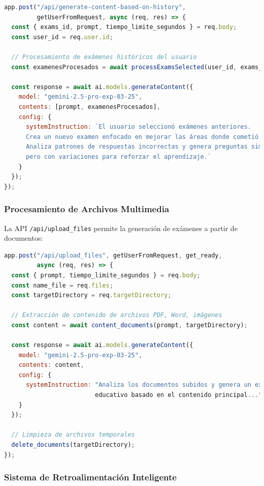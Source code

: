 \documentclass[12pt,a4paper]{report}
\begin{document}
\begin{lstlisting}[language=JavaScript, caption=API para exámenes adaptativos]
app.post("/api/generate-content-based-on-history", 
         getUserFromRequest, async (req, res) => {
  const { exams_id, prompt, tiempo_limite_segundos } = req.body;
  const user_id = req.user.id;

  // Procesamiento de exámenes históricos del usuario
  const examenesProcesados = await processExamsSelected(user_id, exams_id);
  
  const response = await ai.models.generateContent({
    model: "gemini-2.5-pro-exp-03-25",
    contents: [prompt, examenesProcesados],
    config: {
      systemInstruction: `El usuario seleccionó exámenes anteriores.
      Crea un nuevo examen enfocado en mejorar las áreas donde cometió errores.
      Analiza patrones de respuestas incorrectas y genera preguntas similares
      pero con variaciones para reforzar el aprendizaje.`
    }
  });
});
\end{lstlisting}

\subsubsection{Procesamiento de Archivos Multimedia}

La API \texttt{/api/upload\_files} permite la generación de exámenes a partir de documentos:

\begin{lstlisting}[language=JavaScript, caption=API de procesamiento de archivos]
app.post("/api/upload_files", getUserFromRequest, get_ready, 
         async (req, res) => {
  const { prompt, tiempo_limite_segundos } = req.body;
  const name_file = req.files;
  const targetDirectory = req.targetDirectory;
  
  // Extracción de contenido de archivos PDF, Word, imágenes
  const content = await content_documents(prompt, targetDirectory);
  
  const response = await ai.models.generateContent({
    model: "gemini-2.5-pro-exp-03-25",
    contents: content,
    config: { 
      systemInstruction: "Analiza los documentos subidos y genera un examen 
                         educativo basado en el contenido principal..." 
    }
  });
  
  // Limpieza de archivos temporales
  delete_documents(targetDirectory);
});
\end{lstlisting}

\subsubsection{Sistema de Retroalimentación Inteligente}
\end{document}
